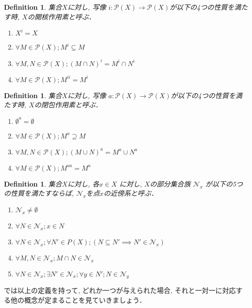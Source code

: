 \documentclass[lualatex]{ltjsbook}
\newtheorem{definition}[theorem]{Definition}
\theoremstyle{remark}
\theoremstyle{plain}
\begin{document}
\begin{definition}
	集合$X$に対し,  写像 $i: \mathcal{P}(X) \to \mathcal{P}(X)$が以下の4つの性質を満たす時,   $X$の開核作用素と呼ぶ．
	 \begin{enumerate}
		\item $X^{i}=X$
		\item $\forall M \in \mathcal{P}(X); M^{i}\subseteq M$
		\item $\forall M , N \in \mathcal{P}(X); \left( M \cap N \right) ^{i} = M^{i} \cap N^{i}$
		\item $\forall M \in \mathcal{P}(X); M^{ii}= M^{i}$
	\end{enumerate}
\end{definition}

\begin{definition}
	集合$X$に対し,  写像 $a: \mathcal{P}(X) \to \mathcal{P}(X)$が以下の4つの性質を満たす時,   $X$の閉包作用素と呼ぶ．
	 \begin{enumerate}
		\item $\emptyset^{a}=\emptyset$
		\item $\forall M \in \mathcal{P}(X); M^{a}\supseteq M$
		\item $\forall M , N \in \mathcal{P}(X); \left( M \cup N \right) ^{a} = M^{a} \cup N^{a}$
		\item $\forall M \in \mathcal{P}(X); M^{aa}= M^{a}$
	\end{enumerate}

\end{definition}

\begin{definition}
	集合$X$に対し,  各$x \in X$ に対し,  $X$の部分集合族 $\mathcal{N}_x$ が以下の5つの性質を満たすならば,  $\mathcal{N}_x$を点$x$の近傍系と呼ぶ．
	\begin{enumerate}
		\item $\mathcal{N}_x \neq \emptyset$
		\item $ \forall N \in \mathcal{N}_x; x \in N$
		\item $ \forall N \in \mathcal{N}_x; \forall N' \in P(X); \left( N \subseteq N' \implies N' \in \mathcal{N}_x \right) $ 
		\item $\forall M,  N \in \mathcal{N}_x ; M  \cap N \in \mathcal{N}_x $ 
		\item $\forall N \in \mathcal{N}_x; \exists N' \in \mathcal{N}_x ; \forall y \in N'; N \in \mathcal{N}_y$
	\end{enumerate}
\end{definition}
 \newpage
では以上の定義を持って,  どれか一つが与えられた場合,  それと一対一に対応する他の概念が定まることを見ていきましょう．
\end{document}
